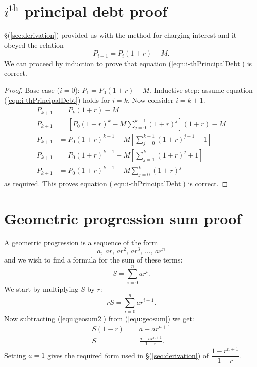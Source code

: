 \documentclass[]{scrartcl}
\theoremstyle{definition}
\renewcommand{\sec}[1]{\S \ref{#1}}
\let\oldref\ref
\renewcommand{\ref}[1]{(\oldref{#1})}
\begin{document}
\section{$i^{\textrm{th}}$ principal debt proof}\label{appendix:principal-debt}
\sec{sec:derivation} provided us with the method for charging interest and it obeyed the relation
\begin{equation}\label{eqn:principal-debt-relation}
    P_{i+1} = P_i(1 + r) - M.
\end{equation}
We can proceed by induction to prove that equation \ref{eqn:i-thPrincipalDebt} is correct.
\begin{proof}
    Base case ($i = 0$): $P_1 = P_0 (1 + r) - M$.
    Inductive step: assume equation \ref{eqn:i-thPrincipalDebt} holds for $i = k$. Now consider $i = k+1$.
    \begin{align}
        P_{k+1} &= P_k (1 + r) - M \\
        P_{k+1} &= \left[P_0(1+r)^k - M\sum_{j=0}^{k-1}(1+r)^j\right] (1 + r) - M \\
        P_{k+1} &= P_0(1+r)^{k+1} - M\left[\sum_{j=0}^{k-1}(1+r)^{j+1} + 1\right] \\
        P_{k+1} &= P_0(1+r)^{k+1} - M\left[\sum_{j=1}^{k}(1+r)^{j} + 1\right] \\
        P_{k+1} &= P_0(1+r)^{k+1} - M\sum_{j=0}^{k}(1+r)^{j}
    \end{align}
    as required. This proves equation \ref{eqn:i-thPrincipalDebt} is correct.
\end{proof}

\section{Geometric progression sum proof}\label{appendix:geo-sum-proof}
A geometric progression is a sequence of the form
\begin{equation}
    a,\,ar,\,ar^2,\,ar^3,\,\hdots,\,ar^n
\end{equation}
and we wish to find a formula for the sum of these terms:
\begin{equation}\label{equ:geosum}
    S = \sum_{i = 0}^{n}ar^i.
\end{equation}
We start by multiplying $S$ by $r$:
\begin{equation}\label{equ:geosum2}
    rS = \sum_{i = 0}^{n}ar^{i+1}.
\end{equation}
Now subtracting \ref{equ:geosum2} from \ref{equ:geosum} we get:
\begin{align*}
    S(1-r) &= a - ar^{n+1} \\
    S&= \frac{a - ar^{n+1}}{1-r}.
\end{align*}
Setting $a = 1$ gives the required form used in \sec{sec:derivation} of $\dfrac{1 - r^{n+1}}{1-r}$.
\end{document}
